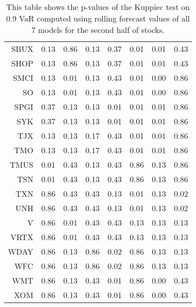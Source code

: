 \begin{table}[ht]
\begin{tabular}{rrrrrrrr}
  SBUX & 0.13 & 0.86 & 0.13 & 0.37 & 0.01 & 0.01 & 0.43 \\ 
  SHOP & 0.13 & 0.86 & 0.13 & 0.37 & 0.01 & 0.01 & 0.43 \\ 
  SMCI & 0.13 & 0.01 & 0.13 & 0.43 & 0.01 & 0.00 & 0.86 \\ 
  SO & 0.13 & 0.01 & 0.13 & 0.43 & 0.01 & 0.00 & 0.86 \\ 
  SPGI & 0.37 & 0.13 & 0.13 & 0.01 & 0.01 & 0.01 & 0.86 \\ 
  SYK & 0.37 & 0.13 & 0.13 & 0.01 & 0.01 & 0.01 & 0.86 \\ 
  TJX & 0.13 & 0.13 & 0.17 & 0.43 & 0.01 & 0.01 & 0.86 \\ 
  TMO & 0.13 & 0.13 & 0.17 & 0.43 & 0.01 & 0.01 & 0.86 \\ 
  TMUS & 0.01 & 0.43 & 0.13 & 0.43 & 0.86 & 0.13 & 0.86 \\ 
  TSN & 0.01 & 0.43 & 0.13 & 0.43 & 0.86 & 0.13 & 0.86 \\ 
  TXN & 0.86 & 0.43 & 0.43 & 0.13 & 0.01 & 0.13 & 0.02 \\ 
  UNH & 0.86 & 0.43 & 0.43 & 0.13 & 0.01 & 0.13 & 0.02 \\ 
  V & 0.86 & 0.01 & 0.43 & 0.43 & 0.13 & 0.13 & 0.13 \\ 
  VRTX & 0.86 & 0.01 & 0.43 & 0.43 & 0.13 & 0.13 & 0.13 \\ 
  WDAY & 0.86 & 0.13 & 0.86 & 0.02 & 0.86 & 0.13 & 0.13 \\ 
  WFC & 0.86 & 0.13 & 0.86 & 0.02 & 0.86 & 0.13 & 0.13 \\ 
  WMT & 0.86 & 0.13 & 0.43 & 0.01 & 0.86 & 0.00 & 0.43 \\ 
  XOM & 0.86 & 0.13 & 0.43 & 0.01 & 0.86 & 0.00 & 0.43 \\ 
   \hline
\end{tabular}
\caption[Kupiec test p-values, alpha =0.9 (2)]{This table shows the p-values of the Kuppiec test on 0.9 VaR computed using rolling forecast values of all 7 models for the second half of stocks.} 
\label{Table:Kupiec_test_rolling_0.9_2}
\end{table}
